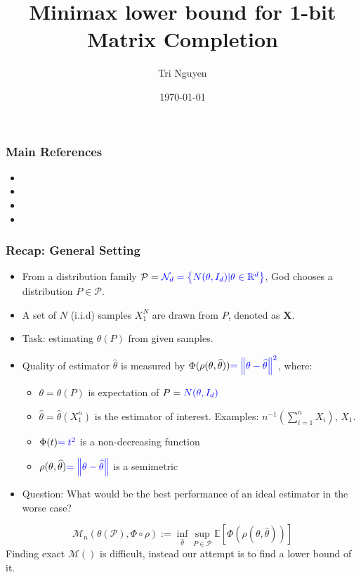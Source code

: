 \documentclass[10pt,xcolor={usenames,dvipsnames,table},aspectratio=169]{beamer}
\title{Minimax lower bound for 1-bit Matrix Completion}
\author{Tri Nguyen}
\institute[OSU] 
{
    Reading group - Summer 2022 \\
Oregon State University 
}
\date{\today} %
\begin{document}
\frame{\titlepage}


\begin{frame}
    \frametitle{Main References}
    \begin{itemize}
        \item {}
        \item {}
        \item {}
        \item {}
    \end{itemize}
\end{frame}

\begin{frame}
    \frametitle{Recap: General Setting}
    \begin{itemize}
        \item From a distribution family $\mathcal{P} = {\color{blue} \mathcal{N}_d = \left\{N(\theta, I_d) | \theta \in \mathbb{R}^{d}\right\}}$, God chooses a distribution $P \in \mathcal{P}$.
        \item A set of $N$ (i.i.d) samples $X_1^{N}$ are drawn from  $P$, denoted as $\bm{X}$.
        \item Task: estimating $\theta(P)$ from given samples. 
        \item Quality of estimator $\widehat{\theta}$ is measured by $\Phi(\rho(\theta, \widehat{\theta})) {\color{blue} = \left\lVert\theta - \widehat{\theta}\right\rVert^2}$, where:
            \begin{itemize}
                \item $\theta = \theta(P)$  is {\blue expectation} of $P = {\color{blue} N(\theta, I_d)}$
                \item  $\widehat{\theta} = \widehat{\theta}(X_1^{n})$ is the estimator of interest. Examples: $n^{-1}(\sum^{n}_{i=1} X_i )$, $X_1$.
                \item $\Phi(t)  {\color{blue} = t^2}$ is a non-decreasing function
                \item $\rho(\theta, \widehat{\theta}) {\color{blue} = \left\lVert\theta - \widehat{\theta}\right\rVert}$ is a semimetric
            \end{itemize}
        \item Question: What would be the best performance of an ideal estimator in the worse case?
    \end{itemize}
    \[
    \mathcal{M}_n(\theta(\mathcal{P}), \Phi \circ \rho) := \inf_{\widehat{\theta}} \sup_{P \in \mathcal{P}} \mathbb{E} \left[  \Phi(\rho(\theta, \widehat{\theta})) \right]
    \] 
    Finding exact $\mathcal{M}()$ is difficult, instead our attempt is to find a lower bound of it.
\end{frame}
\end{document}
